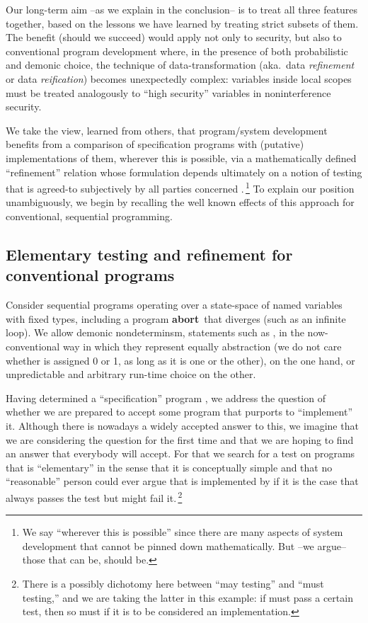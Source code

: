 \documentclass[runningheads]{llncs}
\newcommand\Abort {\textbf{abort}}
\begin{document}
Our long-term aim --as we explain in the conclusion-- is to treat all three features together, based on the lessons we have learned by treating strict subsets of them. The benefit (should we succeed) would apply not only to security, but also to conventional program development where, in the presence of both probabilistic and demonic choice, the technique of data-transformation (aka.\ data \emph{refinement} or data \emph{reification}) becomes unexpectedly complex: variables inside local scopes must be treated analogously to ``high security'' variables in noninterference security.

We take the view, learned from others, that program/system development benefits from a comparison of specification programs with (putative) implementations of them, wherever this is possible, via a mathematically defined ``refinement'' relation whose formulation depends ultimately on a notion of testing that is agreed-to subjectively by all parties concerned \cite{Nicola:84}.\,\footnote{We say ``wherever this is possible'' since there are many aspects of system development that cannot be pinned down mathematically. But --we argue-- those that can be, should be.}
To explain our position unambiguously, we begin by recalling the well known effects of this approach for conventional, sequential programming.

\subsection{Elementary testing and refinement for conventional programs}\label{s1309}
Consider sequential programs operating over a state-space of named variables with fixed types, including a program \Abort\ that diverges (such as an infinite loop). We allow demonic nondeterminsm, statements such as , in the now-conventional way in which they represent equally abstraction (we do not care whether  is assigned 0 or 1, as long as it is one or the other), on the one hand, or unpredictable and arbitrary run-time choice on the other.

Having determined a ``specification'' program , we address the question of whether we are prepared to accept some program  that purports to ``implement'' it. Although there is nowadays a widely accepted answer to this, we imagine that we are considering the question for the first time and that we are hoping to find an answer that everybody will accept. For that we search for a test on programs that is ``elementary'' in the sense that it is conceptually simple and that no ``reasonable'' person could ever argue that  is implemented by  if it is the case that  always passes the test but  might fail it.\,\footnote{There is a possibly dichotomy here between ``may testing'' and ``must testing,'' and we are taking the latter in this example: if  must pass a certain test, then so must  if it is to be considered an implementation.}
\end{document}
